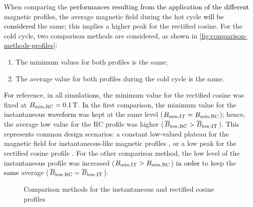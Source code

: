 \documentclass[referee]{svjour3}
\begin{document}
When comparing the \textcolor{black}{performances resulting from the application of the different} magnetic profiles, the average magnetic field during the hot cycle \textcolor{black}{will be considered} the same; this implies a higher peak for the rectified cosine. For the cold cycle, two comparison methods are considered, as shown in \autoref{fig:comparison-methods-profiles}:

\begin{enumerate}
\item The minimum values for both profiles is the same;
\item The average value for both profiles during the cold cycle is the same.
\end{enumerate}


\textcolor{black}{For} reference, in all simulations,  the minimum value for the rectified cosine was fixed at ${B}_{\mathrm{min,RC}} = \SI{0.1}{\tesla}$. \textcolor{black}{In} the first comparison, the minimum value for the instantaneous \textcolor{black}{waveform} was kept at the same level (${B}_{\mathrm{min,IT}} =  {B}_{\mathrm{min,RC}}$); hence, the average low value for the RC profile was higher ($\overline{B}_{\mathrm{low,RC}} > \overline{B}_{\mathrm{low,IT}}$). This represents common design scenarios: a constant low-valued plateau for the magnetic field for instantaneous-like magnetic profiles \cite{bib:insinga16_optim,bib:benedict16_desig}, or a low peak for the rectified cosine profile \cite{bib:trevizoli15_desig_halbac}.  For the other comparison method, the low level of the instantaneous profile was increased (${B}_{\mathrm{min,IT}} >  {B}_{\mathrm{min,RC}}$) \textcolor{black}{in order} to keep the \textcolor{black}{same} average ($\overline{B}_{\mathrm{low,RC}} = \overline{B}_{\mathrm{low,IT}}$). 




\begin{figure}[!ht]
  \centering
\quad
  \caption{Comparison methods for the instantaneous and rectified cosine profiles }
  \label{fig:comparison-methods-profiles}
\end{figure}
\end{document}
